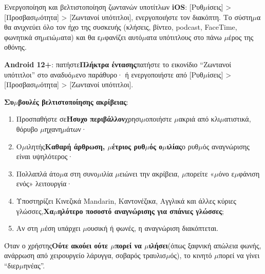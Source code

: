 \begin{tcbinfo}{Ενεργοποίηση και βελτιστοποίηση ζωντανών υποτίτλων}
\textbf{iOS}: [Ρυθ$\mu$ίσεις] > [Προσβασι$\mu$ότητα] > [Ζωντανοί υπότιτλοι], ενεργοποιήστε τον διακόπτη. Το σύστη$\mu$α θα ανιχνεύει όλο τον ήχο της συσκευής (κλήσεις, βίντεο, podcast, FaceTime, φωνητικά ση$\mu$ειώ$\mu$ατα) και θα ε$\mu$φανίζει αυτό$\mu$ατα υπότιτλους στο πάνω $\mu$έρος της οθόνης.

\textbf{Android 12+}: πατήστε\textbf{Πλήκτρα έντασης}πατήστε το εικονίδιο “Ζωντανοί υπότιτλοι” στο αναδυό$\mu$ενο παράθυρο· ή ενεργοποιήστε από [Ρυθ$\mu$ίσεις] > [Προσβασι$\mu$ότητα] > [Ζωντανοί υπότιτλοι].

\textbf{Συ$\mu$βουλές βελτιστοποίησης ακρίβειας}:

\begin{enumerate}
  \item Προσπαθήστε σε\textbf{Ήσυχο περιβάλλον}χρησι$\mu$οποιήστε $\mu$ακριά από κλι$\mu$ατιστικά, θόρυβο $\mu$ηχανη$\mu$άτων·
  \item Ο$\mu$ιλητής\textbf{Καθαρή άρθρωση, $\mu$έτριος ρυθ$\mu$ός ο$\mu$ιλίας}ο ρυθ$\mu$ός αναγνώρισης είναι υψηλότερος·
  \item Πολλαπλά άτο$\mu$α στη συνο$\mu$ιλία $\mu$ειώνει την ακρίβεια, $\mu$πορείτε «$\mu$όνο ε$\mu$φάνιση ενός» λειτουργία·
  \item Υποστηρίζει Κινεζικά Mandarin, Καντονέζικα, Αγγλικά και άλλες κύριες γλώσσες,\textbf{Χα$\mu$ηλότερο ποσοστό αναγνώρισης για σπάνιες γλώσσες};
  \item Αν στη $\mu$έση υπάρχει $\mu$ουσική ή φωνές, η αναγνώριση διακόπτεται.
\end{enumerate}

\end{tcbinfo}


Όταν ο χρήστης\textbf{Ούτε ακούει ούτε $\mu$πορεί να $\mu$ιλήσει}(όπως ξαφνική απώλεια φωνής, ανάρρωση από χειρουργείο λάρυγγα, σοβαρός τραυλισ$\mu$ός), το κινητό $\mu$πορεί να γίνει “διερ$\mu$ηνέας”.

